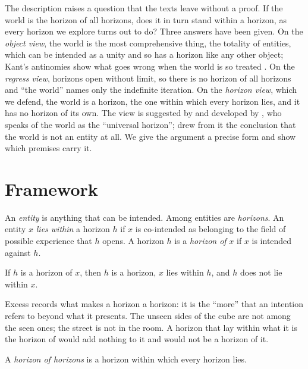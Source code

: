 \documentclass{situationist-preprint}
\begin{document}
The description raises a question that the texts leave without a proof. If the world is the horizon of all horizons, does it in turn stand within a horizon, as every horizon we explore turns out to do? Three answers have been given. On the \emph{object view}, the world is the most comprehensive thing, the totality of entities, which can be intended as a unity and so has a horizon like any other object; Kant's antinomies show what goes wrong when the world is so treated \citep[A405--A567/B432--B595]{Kant1781}. On the \emph{regress view}, horizons open without limit, so there is no horizon of all horizons and \enquote{the world} names only the indefinite iteration. On the \emph{horizon view}, which we defend, the world is a horizon, the one within which every horizon lies, and it has no horizon of its own. The view is suggested by \citet{Landgrebe1940} and developed by \citet{Held1991}, who speaks of the world as the \enquote{universal horizon}; \citet{Fink1958} drew from it the conclusion that the world is not an entity at all. We give the argument a precise form and show which premises carry it.

\section{Framework}

\begin{definition}\label{d:basic}
An \emph{entity} is anything that can be intended. Among entities are \emph{horizons}. An entity $x$ \emph{lies within} a horizon $h$ if $x$ is co-intended as belonging to the field of possible experience that $h$ opens. A horizon $h$ is a \emph{horizon of} $x$ if $x$ is intended against $h$.
\end{definition}

\begin{assumption}[Excess]\label{a:excess}
If $h$ is a horizon of $x$, then $h$ is a horizon, $x$ lies within $h$, and $h$ does not lie within $x$.
\end{assumption}

Excess records what makes a horizon a horizon: it is the \enquote{more} that an intention refers to beyond what it presents. The unseen sides of the cube are not among the seen ones; the street is not in the room. A horizon that lay within what it is the horizon of would add nothing to it and would not be a horizon of it.

\begin{definition}\label{d:hoh}
A \emph{horizon of horizons} is a horizon within which every horizon lies.
\end{definition}
\end{document}
